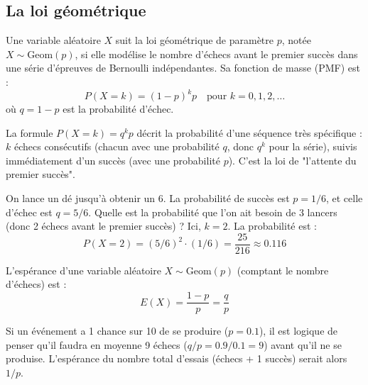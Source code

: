 \subsection{La loi géométrique}

\begin{theorembox}
Une variable aléatoire $X$ suit la loi géométrique de paramètre $p$, notée $X \sim \text{Geom}(p)$, si elle modélise le nombre d'échecs avant le premier succès dans une série d'épreuves de Bernoulli indépendantes. Sa fonction de masse (PMF) est :
$$ P(X=k) = (1-p)^k p \quad \text{pour } k=0, 1, 2, \dots $$
où $q = 1-p$ est la probabilité d'échec.
\end{theorembox}

\begin{intuitionbox}
La formule $P(X=k) = q^k p$ décrit la probabilité d'une séquence très spécifique : $k$ échecs consécutifs (chacun avec une probabilité $q$, donc $q^k$ pour la série), suivis immédiatement d'un succès (avec une probabilité $p$). C'est la loi de "l'attente du premier succès".
\end{intuitionbox}

\begin{examplebox}
On lance un dé jusqu'à obtenir un 6. La probabilité de succès est $p=1/6$, et celle d'échec est $q=5/6$. Quelle est la probabilité que l'on ait besoin de 3 lancers (donc 2 échecs avant le premier succès) ?
Ici, $k=2$. La probabilité est :
$$ P(X=2) = (5/6)^2 \cdot (1/6) = \frac{25}{216} \approx 0.116 $$
\end{examplebox}

\begin{theorembox}
L'espérance d'une variable aléatoire $X \sim \text{Geom}(p)$ (comptant le nombre d'échecs) est :
$$ E(X) = \frac{1-p}{p} = \frac{q}{p} $$
\end{theorembox}

\begin{intuitionbox}
Si un événement a 1 chance sur 10 de se produire ($p=0.1$), il est logique de penser qu'il faudra en moyenne 9 échecs ($q/p = 0.9/0.1=9$) avant qu'il ne se produise. L'espérance du nombre total d'essais (échecs + 1 succès) serait alors $1/p$.
\end{intuitionbox}

